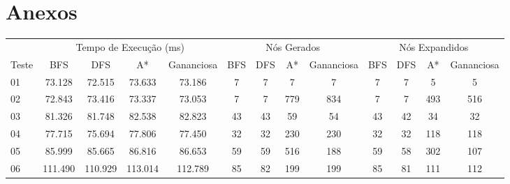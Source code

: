 \documentclass[12pt,a4paper]{article}
\begin{document}

\section*{Anexos}


\begin{adjustbox}{width={\textwidth}, totalheight={\textheight}, keepaspectratio}
      \begin{tabular}{l cccc cccc cccc}
            \toprule
                  & \multicolumn{4}{c}{Tempo de Execução (ms)} & \multicolumn{4}{c}{Nós Gerados} & \multicolumn{4}{c}{Nós Expandidos}                                                                            \\
            \cmidrule(lr){2-5} \cmidrule(lr){6-9} \cmidrule(lr){10-13}
            Teste & BFS                                        & DFS                             & A*                                 & Gananciosa & BFS & DFS & A*  & Gananciosa & BFS & DFS & A*  & Gananciosa \\
            \midrule
            01    & 73.128                                     & 72.515                          & 73.633                             & 73.186     & 7   & 7   & 7   & 7          & 7   & 7   & 5   & 5          \\
            02    & 72.843                                     & 73.416                          & 73.337                             & 73.053     & 7   & 7   & 779 & 834        & 7   & 7   & 493 & 516        \\
            03    & 81.326                                     & 81.748                          & 82.538                             & 82.823     & 43  & 43  & 59  & 54         & 43  & 42  & 34  & 32         \\
            04    & 77.715                                     & 75.694                          & 77.806                             & 77.450     & 32  & 32  & 230 & 230        & 32  & 32  & 118 & 118        \\
            05    & 85.999                                     & 85.665                          & 86.816                             & 86.653     & 59  & 59  & 516 & 188        & 59  & 58  & 302 & 107        \\
            06    & 111.490                                    & 110.929                         & 113.014                            & 112.789    & 85  & 82  & 199 & 199        & 85  & 81  & 111 & 112        \\

\end{tabular}
\end{adjustbox}
\end{document}

